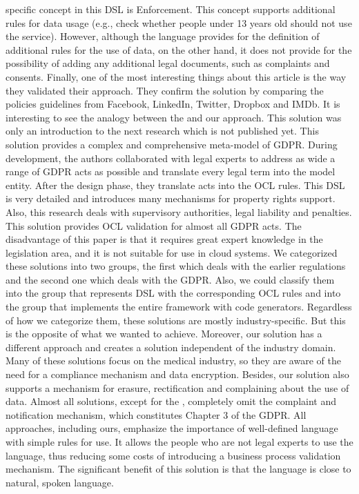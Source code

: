 \documentclass[11pt,english]{article}
\begin{document}
specific concept in this DSL is Enforcement. This concept supports additional rules for data usage (e.g., check whether people under 13 years old should not use the service). However, although the language provides for the definition of additional rules for the use of data, on the other hand, it does not provide for the possibility of adding any additional legal documents, such as complaints and consents. Finally, one of the most interesting things about this article is the way they validated their approach. They confirm the solution by comparing the policies guidelines from Facebook, LinkedIn, Twitter, Dropbox and IMDb. \newline It is interesting to see the analogy between the \cite{torre2019using} and our approach. This solution was only an introduction to the next research  \cite{modeldrivengdpr} which is not published yet. This solution provides a complex and comprehensive meta-model of GDPR. During development, the authors collaborated with legal experts to address as wide a range of GDPR acts as possible and translate every legal term into the model entity. After the design phase, they translate acts into the OCL rules. This DSL is very detailed and introduces many mechanisms for property rights support. Also, this research deals with supervisory authorities, legal liability and penalties. This solution provides OCL validation for almost all GDPR acts. The disadvantage of this paper is that it requires great expert knowledge in the legislation area, and it is not suitable for use in cloud systems. \newline We categorized these solutions into two groups, the first which deals with the earlier regulations and the second one which deals with the GDPR. Also, we could classify them into the group that represents DSL with the corresponding OCL rules and into the group that implements the entire framework with code generators. Regardless of how we categorize them, these solutions are mostly industry-specific. But this is the opposite of what we wanted to achieve. Moreover, our solution has a different approach and creates a solution independent of the industry domain. Many of these solutions focus on the medical industry, so they are aware of the need for a compliance mechanism and data encryption. Besides, our solution also supports a mechanism for erasure, rectification and complaining about the use of data. Almost all solutions, except for the \cite{torre2019using}, completely omit the complaint and notification mechanism, which constitutes Chapter 3 of the GDPR. All approaches, including ours, emphasize the importance of well-defined language with simple rules for use. It allows the people who are not legal experts to use the language, thus reducing some costs of introducing a business process validation mechanism. The significant benefit of this solution is that the language is close to natural, spoken language.
\end{document}
